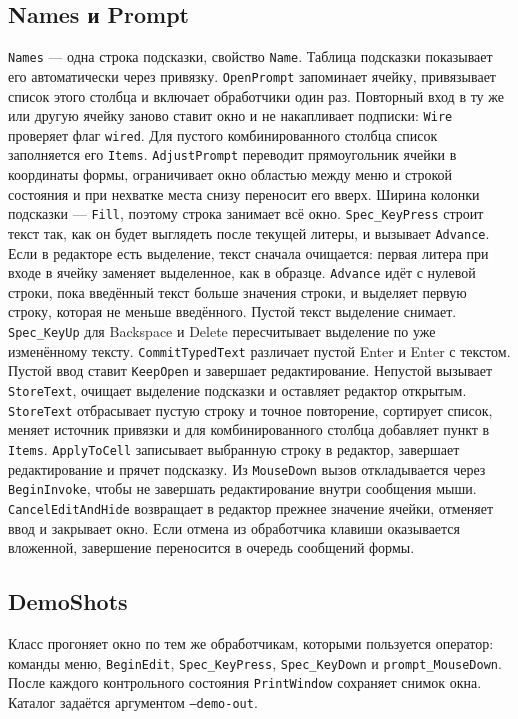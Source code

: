 \documentclass[a4paper,14pt]{extarticle}
\begin{document}
\subsection{Names и Prompt}
\texttt{Names} --- одна строка подсказки, свойство \texttt{Name}. Таблица подсказки показывает его автоматически через привязку.
\texttt{OpenPrompt} запоминает ячейку, привязывает список этого столбца и включает обработчики один раз. Повторный вход в ту же или другую ячейку заново ставит окно и не накапливает подписки: \texttt{Wire} проверяет флаг \texttt{wired}. Для пустого комбинированного столбца список заполняется его \texttt{Items}.
\texttt{AdjustPrompt} переводит прямоугольник ячейки в координаты формы, ограничивает окно областью между меню и строкой состояния и при нехватке места снизу переносит его вверх. Ширина колонки подсказки --- \texttt{Fill}, поэтому строка занимает всё окно.
\texttt{Spec\_KeyPress} строит текст так, как он будет выглядеть после текущей литеры, и вызывает \texttt{Advance}. Если в редакторе есть выделение, текст сначала очищается: первая литера при входе в ячейку заменяет выделенное, как в образце. \texttt{Advance} идёт с нулевой строки, пока введённый текст больше значения строки, и выделяет первую строку, которая не меньше введённого. Пустой текст выделение снимает. \texttt{Spec\_KeyUp} для Backspace и Delete пересчитывает выделение по уже изменённому тексту.
\texttt{CommitTypedText} различает пустой Enter и Enter с текстом. Пустой ввод ставит \texttt{KeepOpen} и завершает редактирование. Непустой вызывает \texttt{StoreText}, очищает выделение подсказки и оставляет редактор открытым. \texttt{StoreText} отбрасывает пустую строку и точное повторение, сортирует список, меняет источник привязки и для комбинированного столбца добавляет пункт в \texttt{Items}.
\texttt{ApplyToCell} записывает выбранную строку в редактор, завершает редактирование и прячет подсказку. Из \texttt{MouseDown} вызов откладывается через \texttt{BeginInvoke}, чтобы не завершать редактирование внутри сообщения мыши. \texttt{CancelEditAndHide} возвращает в редактор прежнее значение ячейки, отменяет ввод и закрывает окно. Если отмена из обработчика клавиши оказывается вложенной, завершение переносится в очередь сообщений формы.
\subsection{DemoShots}
Класс прогоняет окно по тем же обработчикам, которыми пользуется оператор: команды меню, \texttt{BeginEdit}, \texttt{Spec\_KeyPress}, \texttt{Spec\_KeyDown} и \texttt{prompt\_MouseDown}. После каждого контрольного состояния \texttt{PrintWindow} сохраняет снимок окна. Каталог задаётся аргументом \texttt{--demo-out}.
\end{document}
